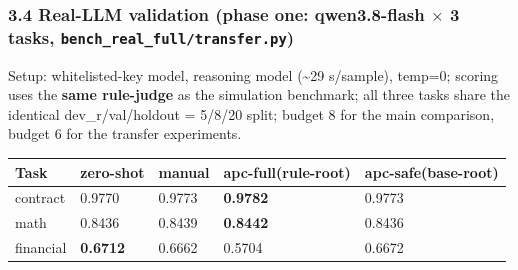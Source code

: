 \subsubsection{\texorpdfstring{3.4 Real-LLM validation (phase one: qwen3.8-flash \(\times\) 3 tasks, \texttt{bench\_real\_full/transfer.py})}{3.4 Real-LLM validation (phase one: qwen3.8-flash \textbackslash times 3 tasks, bench\_real\_full/transfer.py)}}\label{34-real-llm-validation-phase-one-qwen38-flash-times-3-tasks-bench_real_fulltransferpy}

Setup: whitelisted-key model, reasoning model (\textasciitilde29 s/sample), temp=0; scoring uses the \textbf{same rule-judge} as the simulation benchmark; all three tasks share the identical dev\_r/val/holdout = 5/8/20 split; budget 8 for the main comparison, budget 6 for the transfer experiments.

\begin{longtable}[]{@{}lllll@{}}
\toprule\noalign{}
Task & zero-shot & manual & apc-full(rule-root) & apc-safe(base-root) \\
\midrule\noalign{}
\endhead
\bottomrule\noalign{}
\endlastfoot
contract & 0.9770 & 0.9773 & \textbf{0.9782} & 0.9773 \\
math & 0.8436 & 0.8439 & \textbf{0.8442} & 0.8436 \\
financial & \textbf{0.6712} & 0.6662 & 0.5704 & 0.6672 \\
\end{longtable}

